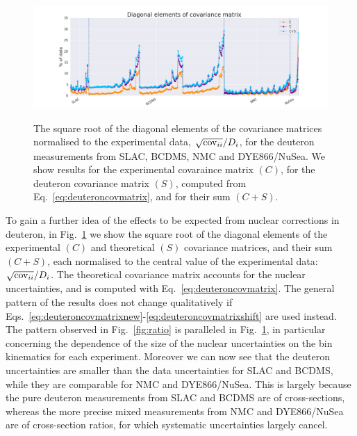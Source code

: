 \documentclass[11pt,a4paper]{article}
\begin{document}
\begin{figure}[!t]
  \centering
   \includegraphics[width=\linewidth,clip=true,trim=4cm 0 4cm 0]{plots/diag_covmat_ite_1}\\
   \caption{The square root of the diagonal elements of the covariance matrices
     normalised to the experimental data, $\sqrt{{\rm cov}_{ii}}/D_i$, for the
     deuteron measurements from SLAC, BCDMS, NMC and DYE866/NuSea. We show
     results for the experimental covaraince matrix $(C)$, for the deuteron
     covariance matrix $(S)$, computed from Eq.~\eqref{eq:deuteroncovmatrix},
     and for their sum $(C+S)$.}
  \label{fig:diagonal}
\end{figure}


To gain a further idea of the effects to be expected from nuclear corrections
in deuteron, in Fig.~\ref{fig:diagonal} we show the square root of the diagonal
elements of the experimental $(C)$ and theoretical $(S)$ covariance matrices,
and their sum $(C+S)$, each normalised to the central value of the experimental
data: $\sqrt{{\rm cov}_{ii}}/D_i$. The theoretical covariance matrix
accounts for the nuclear uncertainties, and is computed with
Eq.~\eqref{eq:deuteroncovmatrix}. The general pattern of the results does not
change qualitatively if
Eqs.~\eqref{eq:deuteroncovmatrixnew}-\eqref{eq:deuteroncovmatrixshift}
are used instead.
The pattern observed in Fig.~\ref{fig:ratio} is paralleled in
Fig.~\ref{fig:diagonal}, in particular concerning the dependence of the size of
the nuclear uncertainties on the bin kinematics for each experiment. Moreover
we can now see that the deuteron uncertainties are smaller than the data
uncertainties for SLAC and BCDMS, while they are comparable for NMC and
DYE866/NuSea. This is largely because the pure deuteron measurements from
SLAC and BCDMS are of cross-sections, whereas the more precise mixed
measurements from NMC and DYE866/NuSea 
are of cross-section ratios, for which systematic uncertainties largely cancel. 
\end{document}
